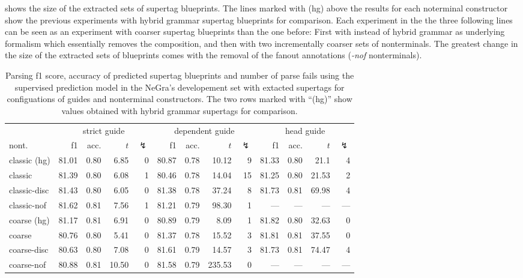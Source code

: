 \documentclass[../../document.tex]{subfiles}
\begin{document}
     shows the size of the extracted sets of supertag blueprints.
    The lines marked with (hg) above the results for each noterminal constructor show the previous experiments with hybrid grammar supertag blueprints for comparison.
    Each experiment in the the three following lines can be seen as an experiment with coarser supertag blueprints than the one before:
        First with  instead of hybrid grammar as underlying formalism which essentially removes the  composition, and then with two incrementally coarser sets of nonterminals.
    The greatest change in the size of the extracted sets of blueprints comes with the removal of the fanout annotations (\emph{-nof} nonterminals).

    \begin{table}
        \caption{\label{tbl:gridsearch:dcp:2}
        Parsing f1 score, accuracy of predicted supertag blueprints and number of parse fails using the supervised prediction model in the NeGra's developement set with extacted  supertags for configuations of guides and nonterminal constructors. The two rows marked with ``(hg)'' show values obtained with hybrid grammar supertags for comparison.
        }
        \centering
        \setlength{\tabcolsep}{5pt}
        \vspace{.2cm}
        \begin{tabular}{l|rrrr|rrrr|rrrr}
            \toprule
                    & \multicolumn{4}{c|}{strict guide} &  \multicolumn{4}{c|}{dependent guide} &  \multicolumn{4}{c}{head guide} \\
nont.            & f1 & acc. & $t$ & $\lightning$ & f1 & acc. & $t$ & $\lightning$ & f1 & acc. & $t$ & $\lightning$ \\ \hline
\rowcolor{black!10}
classic (hg)     & 81.01 & 0.80 &  6.85 & 0 & 80.87 & 0.78 &  10.12 &  9 & 81.33 & 0.80 & 21.1 & 4 \\\hline
classic          & 81.39 & 0.80 &  6.08 & 1 & 80.46 & 0.78 &  14.04 & 15 & 81.25 & 0.80 & 21.53 & 2 \\
classic-disc     & 81.43 & 0.80 &  6.05 & 0 & 81.38 & 0.78 &  37.24 &  8 & 81.73 & 0.81 & 69.98 & 4 \\
classic-nof      & 81.62 & 0.81 &  7.56 & 1 & 81.21 & 0.79 &  98.30 &  1 & --- & --- & --- & --- \\ \hline
\rowcolor{black!10}
coarse (hg)      & 81.17 & 0.81 &  6.91 & 0 & 80.89 & 0.79 &   8.09 &  1 & 81.82 & 0.80 & 32.63 & 0 \\\hline
coarse           & 80.76 & 0.80 &  5.41 & 0 & 81.37 & 0.78 &  15.52 &  3 & 81.81 & 0.81 & 37.55 & 0 \\
coarse-disc      & 80.63 & 0.80 &  7.08 & 0 & 81.61 & 0.79 &  14.57 &  3 & 81.73 & 0.81 & 74.47 & 4 \\
coarse-nof       & 80.88 & 0.81 & 10.50 & 0 & 81.58 & 0.79 & 235.53 &  0 & --- & --- & --- & --- \\
\bottomrule
        \end{tabular}
    \end{table}
\end{document}
